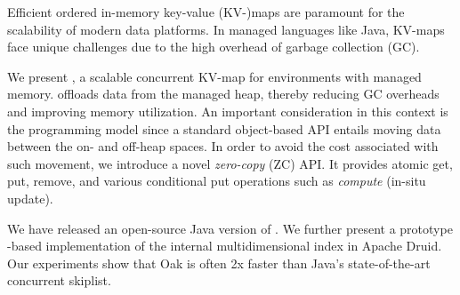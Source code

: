 Efficient ordered in-memory key-value (KV-)maps are paramount for the scalability of modern data platforms. In managed  
languages like Java, KV-maps face unique challenges due to the high overhead of garbage collection (GC).

We present \oak, a scalable concurrent KV-map for environments with managed memory. \oak\/ offloads data from the managed 
 heap, thereby reducing GC overheads and improving memory utilization.
An important consideration in this context is the programming model since a standard object-based API 
entails moving data between the on- and off-heap spaces. 
In order to avoid the cost associated with such movement, we introduce a novel {\em zero-copy\/} (ZC) API.
It 
provides 
atomic get, put, remove, and various conditional put operations such as \emph{compute} (in-situ update). 

We have released an open-source Java version of \oak. 
We further present a prototype \oak-based implementation of the internal multidimensional index in Apache Druid. 
Our experiments show that Oak is often 2x faster than Java's state-of-the-art concurrent skiplist.
